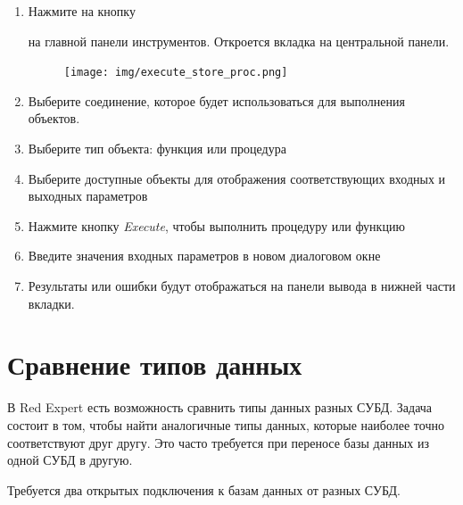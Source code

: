 \begin{enumerate}[leftmargin=20pt]
	\item Нажмите на кнопку  на главной панели инструментов. Откроется вкладка на центральной панели.
	\begin{figure}[H]
		\centering
		\texttt{[image: img/execute\_store\_proc.png]}
	\end{figure}
	
	\item Выберите соединение, которое будет использоваться для выполнения объектов.
	\item Выберите тип объекта: функция или процедура
	\item Выберите доступные объекты для отображения соответствующих входных и выходных параметров
	\item Нажмите кнопку \textit{Execute}, чтобы выполнить процедуру или функцию
	\item Введите значения входных параметров в новом диалоговом окне
	\item Результаты или ошибки будут отображаться на панели вывода в нижней части вкладки.
\end{enumerate}

\newpage

\section{Сравнение типов данных}\label{sec:compare_datatype}

В Red Expert есть возможность сравнить типы данных разных СУБД. Задача состоит в том, чтобы найти аналогичные типы данных, которые наиболее точно соответствуют друг другу. Это часто требуется при переносе базы данных из одной СУБД в другую.

Требуется два открытых подключения к базам данных от разных СУБД.


